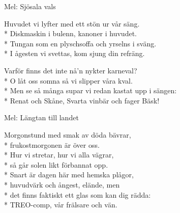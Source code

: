 \begin{SongText}[Antisnapsvisa]
    \begin{SongInfo}
        Mel: Sjösala vals
    \end{SongInfo}
    \begin{SongVerse}
        Huvudet vi lyfter med ett stön ur vår säng.\\*%
        Diskmaskin i bulenn, kanoner i huvudet.\\*%
        Tungan som en plyschsoffa och yrselns i sväng.\\*%
        I ågesten vi svettas, kom sjung din refräng.
    \end{SongVerse}
    \begin{SongVerse}
        Varför finns det inte nå’n nykter karneval?\\*%
        O låt oss somna så vi slipper våra kval.\\*%
        Men se så många supar vi redan kastat upp i sängen:\\*%
        Renat och Skåne, Svarta vinbär och fager Bäsk!
    \end{SongVerse}
\end{SongText}
\begin{SongText}[TREO]
    \begin{SongInfo}
        Mel: Längtan till landet
    \end{SongInfo}
    \begin{SongVerse}
        Morgonstund med smak av döda bävrar,\\*%
        frukostmorgonen är över oss.\\*%
        Hur vi stretar, hur vi alla vägrar,\\*%
        så går solen likt förbannat opp.\\*%
        Snart är dagen här med hemska plågor,\\*%
        huvudvärk och ångest, elände, men\\*%
        det finns faktiskt ett glas som kan dig rädda:\\*%
        TREO-comp, vår frälsare och vän.
    \end{SongVerse}
\end{SongText}
